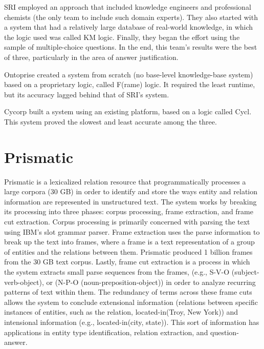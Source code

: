 SRI employed an approach that included knowledge engineers and 
professional chemists (the only team to include such domain experts).
They also started with a system that had a relatively large database
of real-world knowledge, in which the logic used was called KM logic.
Finally, they began the effort using the sample of multiple-choice questions.  In the end, this team's results were the best of three, particularly in the area of answer justification.

Ontoprise created a system from scratch (no base-level knowledge-base system) based on a proprietary logic, called F(rame) logic.  It required the least runtime, but its accuracy lagged behind that of SRI's system.

Cycorp built a system using an existing platform, based on a logic called Cycl.  This system proved the slowest and least accurate among the three.

\section{Prismatic}

Prismatic \cite{fan2012automatic} is a lexicalized relation resource that programmatically processes a large corpora (30 GB) in order to identify and store the ways entity and relation information are represented in unstructured text.  The system works by breaking its processing into
three phases:  corpus processing, frame extraction, and frame cut extraction.  Corpus processing is primarily concerned with parsing the text using IBM's slot grammar parser.  Frame extraction uses the parse information to break up the text into frames, where a frame is a text representation of a group of entities and the relations between them.  Prismatic produced 1 billion frames from the 30 GB text corpus.  Lastly, frame cut extraction is a process in which the system extracts small parse sequences from the frames, (e.g., S-V-O (subject-verb-object), or
(N-P-O (noun-preposition-object)) in order to analyze recurring patterns of text within them.  The redundancy of terms across these frame cuts allows the system to conclude extensional information (relations between specific instances of entities, such as the relation, located-in(Troy, New York)) and intensional information (e.g., located-in(city, state)).  This sort of information has applications in entity type identification, relation extraction, and question-answer.

